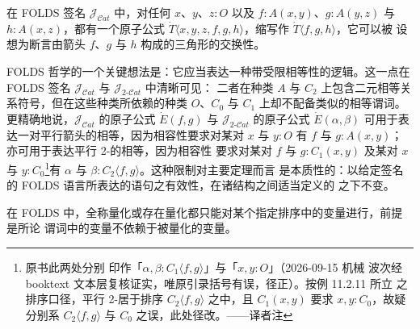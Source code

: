 \begin{example}\label{exa:atomic-formula-commutative-triangle}
在 FOLDS 签名 $\mathcal{J}_{\mathcal{C}at}$ 中，对任何 $x$、$y$、$z:O$ 以及
$f:A(x,y)$、$g:A(y,z)$ 与 $h:A(x,z)$，都有一个原子公式
$\dot{T}\langle x,y,z,f,g,h\rangle$，缩写作 $\dot{T}\langle f,g,h\rangle$，它可以被
设想为断言由箭头 $f$、$g$ 与 $h$ 构成的三角形的交换性。
\end{example}

\begin{digression}\label{dig:restricted-equality}
FOLDS 哲学的一个关键想法是：它应当表达一种带受限相等性的逻辑。这一点在 FOLDS
签名 $\mathcal{J}_{\mathcal{C}at}$ 与 $\mathcal{J}_{2\text{-}\mathcal{C}at}$ 中清晰可见：
二者在种类 $A$ 与 $C_{2}$ 上包含二元相等关系符号，但在这些种类所依赖的种类
$O$、$C_{0}$ 与 $C_{1}$ 上却不配备类似的相等谓词。更精确地说，$\mathcal{J}_{\mathcal{C}at}$
的原子公式 $\dot{E}(f,g)$ 与 $\mathcal{J}_{2\text{-}\mathcal{C}at}$ 的原子公式
$\dot{E}(\alpha,\beta)$ 可用于表达一对平行箭头的相等，因为相容性要求对某对
$x$ 与 $y:O$ 有 $f$ 与 $g:A(x,y)$；亦可用于表达平行 2-\trCell{}的相等，因为相容性
要求对某对 $f$ 与 $g:C_{1}(x,y)$ 及某对 $x$ 与 $y:C_{0}$\footnote{原书此两处分别
印作「$\alpha,\beta:C_{1}\langle f,g\rangle$」与「$x,y:O$」（2026-09-15 机械
波次经 booktext 文本层复核证实，唯原引录括号有误，径正）。按例 11.2.11 所立
之排序口径，平行 2-\trCell{}居于排序 $C_{2}\langle f,g\rangle$ 之中，且
$C_{1}(x,y)$ 要求 $x,y:C_{0}$，故疑分别系 $C_{2}\langle f,g\rangle$ 与 $C_{0}$
之误，此处径改。——译者注}有 $\alpha$ 与 $\beta:C_{2}\langle f,g\rangle$。这种限制对主要定理而言
是本质性的：以给定签名的 FOLDS 语言所表达的语句之有效性，在诸结构之间适当定义的%
\trEquivalence{}之下不变。
\end{digression}

在 FOLDS 中，全称量化或存在量化都只能对某个指定排序中的变量进行，前提是所论
谓词中的变量不依赖于被量化的变量。

